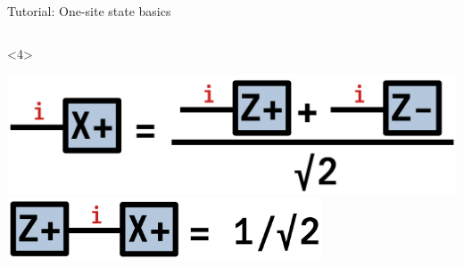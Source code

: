 \begin{frame}[fragile]{Tutorial: One-site state basics}
\begin{columns}
\begin{column}[T]{0.6\textwidth}
\begin{onlyenv}<4>
\vspace*{-0.4cm}
\begin{center}
\includegraphics[width=1.0\textwidth]{
  slides/assets/Zp+Zm.png
} \\
\includegraphics[width=0.7\textwidth]{
  slides/assets/ZpXp.png
}
\end{center}
\end{onlyenv}
\end{column}

\end{columns}

\end{frame}
